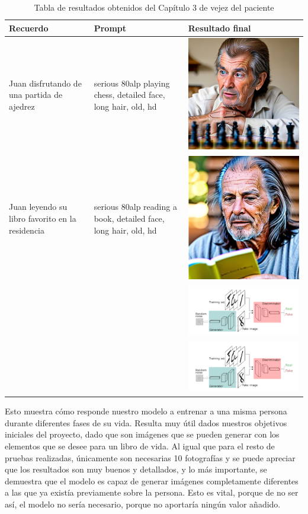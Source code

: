\begin{table}
	\centering
	\begin{tabular}{>{\centering\arraybackslash}m{5cm} >{\arraybackslash}m{5cm}>{\arraybackslash}m{5cm}}
		\textbf{Recuerdo} & \textbf{Prompt} & \textbf{Resultado final} \\
		\hline
		Juan disfrutando de una partida de ajedrez & serious 80alp playing chess, detailed face, long hair, old, hd & \includegraphics[width = 0.3
		\textwidth]{Imagenes/Vectorial/80alpchess.png}\\
		\hline
		 Juan leyendo su libro favorito en la residencia & serious 80alp reading a book, detailed face, long hair, old, hd & \includegraphics[width = 0.3
		\textwidth]{Imagenes/Vectorial/80alpbook.png}\\
		\hline
		& & \includegraphics[width = 0.3
		\textwidth]{Imagenes/Vectorial/gan.png}\\
		\hline
		&  & \includegraphics[width = 0.3
		\textwidth]{Imagenes/Vectorial/gan.png}\\
		\hline
	\end{tabular}
	\caption{Tabla de resultados obtenidos del Capítulo 3 de vejez del paciente}
	\label{tab:capitulo3librovida}
\end{table}

Esto muestra cómo responde nuestro modelo a entrenar a una misma persona durante diferentes fases de su vida. Resulta muy útil dados nuestros objetivos iniciales del proyecto, dado que son imágenes que se pueden generar con los elementos que se desee para un libro de vida. Al igual que para el resto de pruebas realizadas, únicamente son necesarias 10 fotografías y se puede apreciar que los resultados son muy buenos y detallados, y lo más importante, se demuestra que el modelo es capaz de generar imágenes completamente diferentes a las que ya existía previamente sobre la persona. Esto es vital, porque de no ser así, el modelo no sería necesario, porque no aportaría ningún valor añadido.